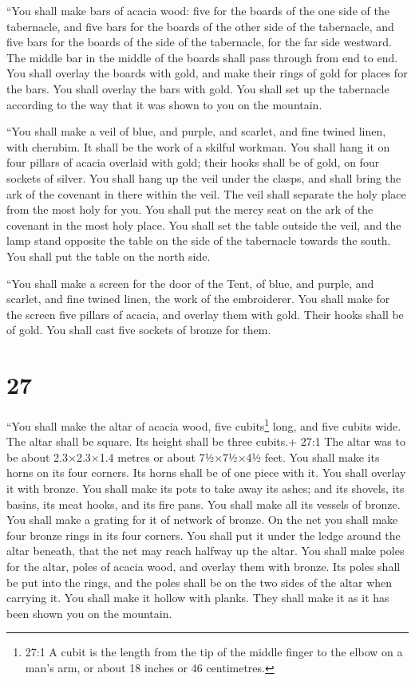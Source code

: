  ``You shall make bars of acacia wood: five for the boards
of the one side of the tabernacle,  and five bars for the
boards of the other side of the tabernacle, and five bars for the boards
of the side of the tabernacle, for the far side westward. 
The middle bar in the middle of the boards shall pass through from end
to end.  You shall overlay the boards with gold, and make
their rings of gold for places for the bars. You shall overlay the bars
with gold.  You shall set up the tabernacle according to
the way that it was shown to you on the mountain.

 ``You shall make a veil of blue, and purple, and scarlet,
and fine twined linen, with cherubim. It shall be the work of a skilful
workman.  You shall hang it on four pillars of acacia
overlaid with gold; their hooks shall be of gold, on four sockets of
silver.  You shall hang up the veil under the clasps, and
shall bring the ark of the covenant in there within the veil. The veil
shall separate the holy place from the most holy for you. 
You shall put the mercy seat on the ark of the covenant in the most holy
place.  You shall set the table outside the veil, and the
lamp stand opposite the table on the side of the tabernacle towards the
south. You shall put the table on the north side.

 ``You shall make a screen for the door of the Tent, of
blue, and purple, and scarlet, and fine twined linen, the work of the
embroiderer.  You shall make for the screen five pillars of
acacia, and overlay them with gold. Their hooks shall be of gold. You
shall cast five sockets of bronze for them.

\hypertarget{section-26}{%
\section{27}\label{section-26}}

 ``You shall make the altar of acacia wood, five
cubits\footnote{27:1 A cubit is the length from the tip of the middle
  finger to the elbow on a man's arm, or about 18 inches or 46
  centimetres.} long, and five cubits wide. The altar shall be square.
Its height shall be three cubits.+ 27:1 The altar was to be about
2.3×2.3×1.4 metres or about 7½×7½×4½ feet.  You shall make
its horns on its four corners. Its horns shall be of one piece with it.
You shall overlay it with bronze.  You shall make its pots
to take away its ashes; and its shovels, its basins, its meat hooks, and
its fire pans. You shall make all its vessels of bronze. 
You shall make a grating for it of network of bronze. On the net you
shall make four bronze rings in its four corners.  You shall
put it under the ledge around the altar beneath, that the net may reach
halfway up the altar.  You shall make poles for the altar,
poles of acacia wood, and overlay them with bronze.  Its
poles shall be put into the rings, and the poles shall be on the two
sides of the altar when carrying it.  You shall make it
hollow with planks. They shall make it as it has been shown you on the
mountain.

